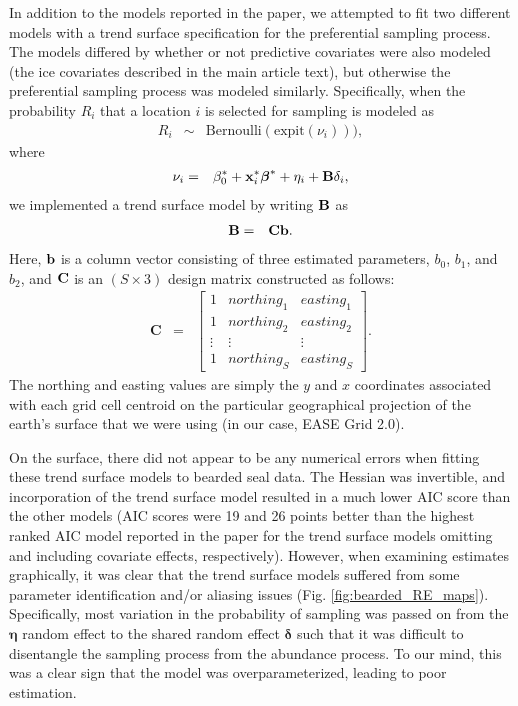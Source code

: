 \documentclass[times,mee,doublespace,]{besauth2}
\begin{document}
\begin{flushleft}

In addition to the models reported in the paper, we attempted to fit two different models with a trend surface specification for the preferential sampling process.  The models differed by whether or not predictive covariates were also modeled (the ice covariates described in the main article text), but otherwise the preferential sampling process was modeled similarly.  Specifically, when the probability $R_i$ that a location $i$ is selected for sampling is modeled as
\begin{eqnarray}
 \label{eq:R}
  R_i & \sim & \text{Bernoulli}(\textrm{expit}(\nu_i))),
\end{eqnarray}
where
\begin{eqnarray}
  \label{eq:nu}
  \nu_i & = & \beta_0^* + {\bf x}_i^* \boldsymbol{\beta}^*+\eta_i+{\bf B} \delta_i,
\label{eq:nu}
\end{eqnarray}
we implemented a trend surface model by writing $\bf{B}$ as
\begin{eqnarray}
  \label{eq:B}
  \textbf{B} & = & {\bf C}{\bf b}.
\end{eqnarray} 
Here, ${\bf b}$ is a column vector consisting of three estimated parameters, $b_0$, $b_1$, and $b_2$, and ${\bf C}$ is an $(S \times 3)$ design matrix constructed as follows:
\begin{eqnarray}
  \textbf{C} & = & \left[ 
    \begin{array}{ccc}
    1 & northing_1 & easting_1 \\
    1 & northing_2 & easting_2 \\
    \vdots & \vdots & \vdots \\
    1 & northing_S & easting_S 
    \end{array} 
  \right].
\end{eqnarray}
The northing and easting values are simply the $y$ and $x$ coordinates associated with each grid cell centroid on the particular geographical projection of the earth's surface that we were using (in our case, EASE Grid 2.0).

\hspace{0.5in} On the surface, there did not appear to be any numerical errors when fitting these trend surface models to bearded seal data.  The Hessian was invertible, and incorporation of the trend surface model resulted in a much lower AIC score than the other models (AIC scores were 19 and 26 points better than the highest ranked AIC model reported in the paper for the trend surface models omitting and including covariate effects, respectively).  However, when examining estimates graphically, it was clear that the trend surface models suffered from some parameter identification and/or aliasing issues (Fig. \ref{fig:bearded_RE_maps}).  Specifically, most variation in the probability of sampling was passed on from the $\boldsymbol{\eta}$ random effect to the shared random effect $\boldsymbol{\delta}$ such that it was difficult to disentangle the sampling process from the abundance process.  To our mind, this was a clear sign that the model was overparameterized, leading to poor estimation.


\end{flushleft}
\end{document}
